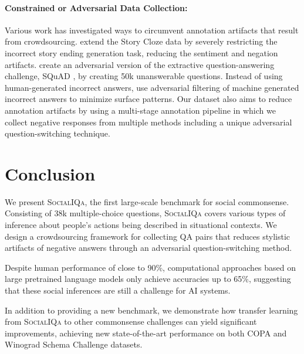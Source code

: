 \paragraph{Constrained or Adversarial Data Collection:} Various work has investigated ways to circumvent annotation artifacts that result from crowdsourcing.
\citet{Sharma2018TacklingTS} extend the Story Cloze data by severely restricting the incorrect story ending generation task, reducing the sentiment and negation artifacts.
\citet{rajpurkar2018know} create an adversarial version of the extractive question-answering challenge, SQuAD \cite{Rajpurkar2016SQuAD10}, by creating 50k unanswerable questions. Instead of using human-generated incorrect answers, \citet{Zellers2018SWAGAL,zellers2019hellaswag} use adversarial filtering of machine generated incorrect answers to minimize surface patterns. Our dataset also aims to reduce annotation artifacts by using a multi-stage annotation pipeline in which we collect negative responses from multiple methods including a unique adversarial question-switching technique.

\section{Conclusion}
We present \textsc{SocialIQa}, the first large-scale benchmark for social commonsense. Consisting of 38k multiple-choice questions, \textsc{SocialIQa} covers various types of inference about people's actions being described in situational contexts. We design a crowdsourcing framework for collecting QA pairs that reduces stylistic artifacts of negative answers through an adversarial question-switching method.

Despite human performance of close to 90\%,
computational approaches based on large pretrained language models only achieve accuracies up to 65\%, suggesting that these social inferences are still a challenge for AI systems.

In addition to providing a new benchmark, we demonstrate how transfer learning from \textsc{SocialIQa} to other commonsense challenges can yield significant improvements, achieving new state-of-the-art performance on both COPA and Winograd Schema Challenge datasets.



